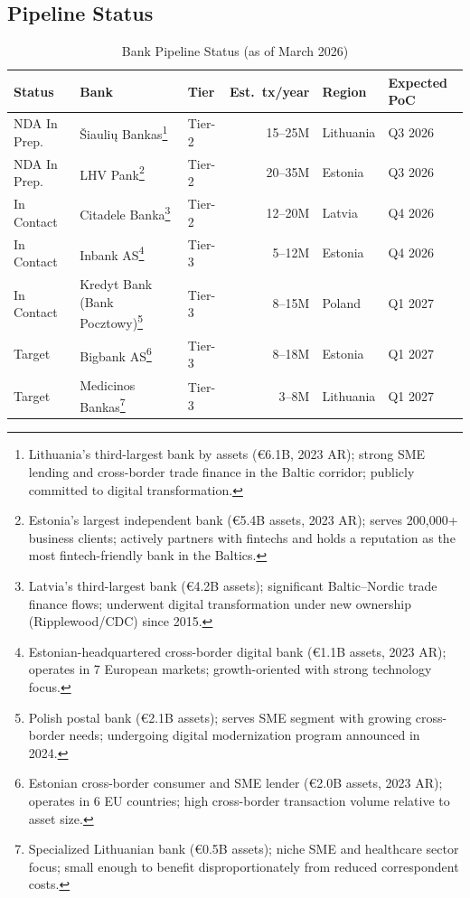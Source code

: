 \documentclass[11pt,a4paper]{article}
\begin{document}
\subsection*{Pipeline Status}

\begin{table}[htbp]
\centering
\caption{Bank Pipeline Status (as of March 2026)}
\footnotesize
\begin{tabularx}{\linewidth}{@{}lp{3cm}lrll@{}}
\toprule
\textbf{Status} & \textbf{Bank} & \textbf{Tier} & \textbf{Est.\ tx/year} & \textbf{Region} & \textbf{Expected PoC} \\
\midrule
NDA In Prep. & \v{S}iauli\k{u} Bankas\footnote{Lithuania's third-largest bank by assets (\euro 6.1B, 2023 AR); strong SME lending and cross-border trade finance in the Baltic corridor; publicly committed to digital transformation.} & Tier-2 & 15--25M & Lithuania & Q3 2026 \\
NDA In Prep. & LHV Pank\footnote{Estonia's largest independent bank (\euro 5.4B assets, 2023 AR); serves 200{,}000+ business clients; actively partners with fintechs and holds a reputation as the most fintech-friendly bank in the Baltics.} & Tier-2 & 20--35M & Estonia & Q3 2026 \\
\midrule
In Contact & Citadele Banka\footnote{Latvia's third-largest bank (\euro 4.2B assets); significant Baltic--Nordic trade finance flows; underwent digital transformation under new ownership (Ripplewood/CDC) since 2015.} & Tier-2 & 12--20M & Latvia & Q4 2026 \\
In Contact & Inbank AS\footnote{Estonian-headquartered cross-border digital bank (\euro 1.1B assets, 2023 AR); operates in 7 European markets; growth-oriented with strong technology focus.} & Tier-3 & 5--12M & Estonia & Q4 2026 \\
In Contact & Kredyt Bank (Bank Pocztowy)\footnote{Polish postal bank (\euro 2.1B assets); serves SME segment with growing cross-border needs; undergoing digital modernization program announced in 2024.} & Tier-3 & 8--15M & Poland & Q1 2027 \\
\midrule
Target & Bigbank AS\footnote{Estonian cross-border consumer and SME lender (\euro 2.0B assets, 2023 AR); operates in 6 EU countries; high cross-border transaction volume relative to asset size.} & Tier-3 & 8--18M & Estonia & Q1 2027 \\
Target & Medicinos Bankas\footnote{Specialized Lithuanian bank (\euro 0.5B assets); niche SME and healthcare sector focus; small enough to benefit disproportionately from reduced correspondent costs.} & Tier-3 & 3--8M & Lithuania & Q1 2027 \\

\end{tabularx}
\end{table}
\end{document}
